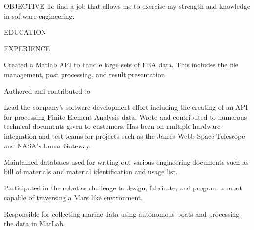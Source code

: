 \documentclass{resume} %
\begin{document}

\begin{newSection}{OBJECTIVE}
To find a job that allows me to exercise my strength and knowledge in software engineering.
\end{newSection}

\begin{newSection}{EDUCATION}
{}
\end{newSection}

\begin{newSection}{EXPERIENCE}
    \begin{myList}
        \item Created a Matlab API to handle large sets of FEA data. This includes the file management, post processing, and result presentation.
        \item Authored and contributed to 
        \item Lead the company's software development effort including the creating of an API for processing Finite Element Analysis data.  Wrote and contributed to numerous technical documents given to customers. Has been on multiple hardware integration and test teams for projects such as the James Webb Space Telescope and NASA's Lunar Gateway.
        \item Maintained databases used for writing out various engineering documents such as bill of materials and material identification and usage list.
    \end{myList}
    
    \begin{myList}
        \item Participated in the robotics challenge to design, fabricate, and program a robot capable of traversing a Mars like environment.
    \end{myList}
    
    \begin{myList}
        \item Responsible for collecting marine data using autonomous boats and processing the data in MatLab.
    \end{myList}
\end{newSection} 
\end{document}
